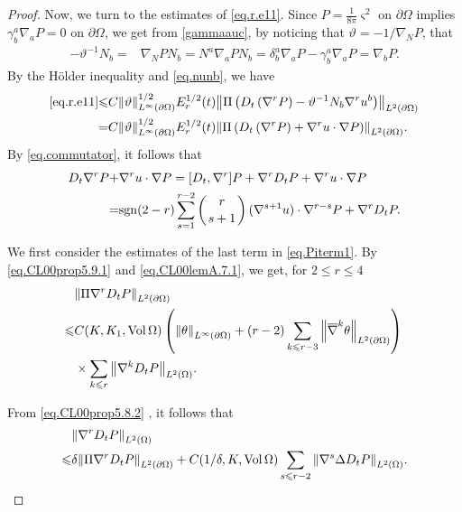\documentclass[12pt,reqno]{amsart}
\numberwithin{equation}{section}
\theoremstyle{definition}
\theoremstyle{remark}
\begin{document}
\begin{proof}
Now, we turn to the estimates of  \eqref{eq.r.e11}. Since ${P }=\frac{1}{8\pi}{\varsigma}^2$ on ${\partial}\Omega$ implies $\gamma_b^a{\nabla}_a {P }=0$ on ${\partial}\Omega$, we get from \eqref{gammaauc}, by noticing that $\vartheta=-1/{\nabla}_N {P }$, that
\begin{align}\label{eq.nunb}
  -\vartheta^{-1}N_b=&{\nabla}_N {P } N_b=N^a{\nabla}_a {P } N_b=\delta_b^a{\nabla}_a{P }-\gamma_b^a{\nabla}_a{P }
  ={\nabla}_b {P }.
\end{align}
 By the H\"older inequality and \eqref{eq.nunb}, we have
\begin{align}
  \eqref{eq.r.e11}{\leqslant} &C{\left\Vert{\vartheta}\right\Vert}_{L^\infty({\partial}\Omega)}^{1/2} E_r^{1/2}(t){\left\Vert{\Pi\left(D_t\left({\nabla}^{r} {P }\right)-\vartheta^{-1}N_b{\nabla}^{r} u^b\right)}\right\Vert}_{L^2({\partial}\Omega)}{\nonumber}\\
  = &C{\left\Vert{\vartheta}\right\Vert}_{L^\infty({\partial}\Omega)}^{1/2} E_r^{1/2}(t){\left\Vert{\Pi\left(D_t\left({\nabla}^{r} {P }\right)+{\nabla}^{r} u\cdot{\nabla} {P }\right)}\right\Vert}_{L^2({\partial}\Omega)}.
\end{align}
By \eqref{eq.commutator}, it follows that
\begin{align}\label{eq.Piterm1}
  D_t{\nabla}^r {P }+&{\nabla}^{r} u\cdot{\nabla} {P }=[D_t,{\nabla}^r]{P }+{\nabla}^r D_t {P }+{\nabla}^{r} u\cdot{\nabla} {P }{\nonumber}\\
  =&{\mathrm{sgn}}(2-r)\sum_{s=1}^{r-2}\left(r\atop s+1\right)({\nabla}^{s+1}u)\cdot {\nabla}^{r-s} {P }+{\nabla}^r D_t {P }.
\end{align}

We first consider the estimates of the last term in \eqref{eq.Piterm1}. By \eqref{eq.CL00prop5.9.1} and \eqref{eq.CL00lemA.7.1}, we get, for $2{\leqslant} r{\leqslant} 4$ 
\begin{align}\label{eq.est.pinbdtp}
  &{\left\Vert{\Pi{\nabla}^rD_t{P }}\right\Vert}_{L^2({\partial}\Omega)}{\nonumber}\\
  {\leqslant}& C(K,K_1,{\mathrm{Vol}\,}\Omega)\left({\left\Vert{\theta}\right\Vert}_{L^\infty({\partial}\Omega)}+(r-2)\sum_{k{\leqslant} r-3}{\left\Vert{{\overline{\nabla}}^k\theta}\right\Vert}_{L^2({\partial}\Omega)}\right){\nonumber}\\
  &\times\sum_{k{\leqslant} r} {\left\Vert{{\nabla}^k D_t{P }}\right\Vert}_{L^2(\Omega)}.
\end{align}

From \eqref{eq.CL00prop5.8.2} , it follows that
\begin{align}\label{eq.est.nbkdtp}
  &{\left\Vert{{\nabla}^r D_t{P }}\right\Vert}_{L^2(\Omega)}{\nonumber}\\
  {\leqslant}& \delta {\left\Vert{\Pi{\nabla}^r D_t{P }}\right\Vert}_{L^2({\partial}\Omega)}+C(1/\delta, K,{\mathrm{Vol}\,}\Omega)\sum_{s{\leqslant} r-2}{\left\Vert{{\nabla}^s\Delta D_t {P }}\right\Vert}_{L^2(\Omega)}.
\end{align}


\end{proof}
\end{document}
